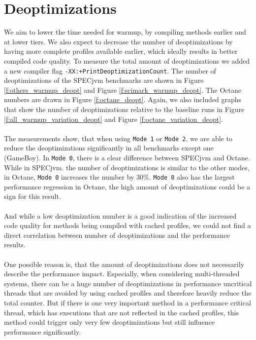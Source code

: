 \section{Deoptimizations}
\label{s:perf_deoptimizations}
We aim to lower the time needed for warmup, by compiling methods earlier and at lower tiers. We also expect to decrease the number of deoptimizations by having more complete profiles available earlier, which ideally results in better compiled code quality. To measure the total amount of deoptimizations we added a new compiler flag \texttt{-XX:+PrintDeoptimizationCount}.
The number of deoptimizations of the SPECjvm benchmarks are shown in Figure \ref{f:others_warmup_deopt} and Figure \ref{f:scimark_warmup_deopt}. The Octane numbers are drawn in Figure \ref{f:octane_deopt}.
Again, we also included graphs that show the number of deoptimizations relative to the baseline runs in Figure \ref{f:all_warmup_variation_deopt} and Figure \ref{f:octane_variation_deopt}.
\\\\
The measurements show, that when using \texttt{Mode 1} or \texttt{Mode 2}, we are able to reduce the deoptimizations significantly in all benchmarks except one (GameBoy). In \texttt{Mode 0}, there is a clear difference between SPECjvm and Octane. While in SPECjvm. the number of deoptimizations is similar to the other modes, in Octane, \texttt{Mode 0} increases the number by 30\%. \texttt{Mode 0} also has the largest performance regression in Octane, the high amount of deoptimizations could be a sign for this result. 
\\\\
And while a low deoptimization number is a good indication of the increased code quality for methods being compiled with cached profiles, we could not find a direct correlation between number of deoptimizations and the performance results.
\\\\
One possible reason is, that the amount of deoptimizations does not necessarily describe the performance impact. Especially, when considering multi-threaded systems, there can be a huge number of deoptimizations in performance uncritical threads that are avoided by using cached profiles and therefore heavily reduce the total counter. But if there is one very important method in a performance critical thread, which has executions that are not reflected in the cached profiles, this method could trigger only very few deoptimizations but still influence performance significantly.
